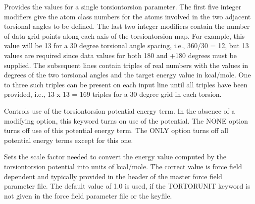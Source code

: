\documentclass[letterpaper,11pt,english]{sphinxmanual}
\begin{document}
\ignorespaces {}\label{\detokenize{text/keywords:key-tortors}}\begin{description}
\sphinxAtStartPar
Provides the values for a single torsion\sphinxhyphen{}torsion parameter. The first five integer modifiers give the atom class numbers for the atoms involved in the two adjacent torsional angles to be defined. The last two integer modifiers contain the number of data grid points along each axis of the torsion\sphinxhyphen{}torsion map. For example, this value will be 13 for a 30 degree torsional angle spacing, i.e., 360/30 = 12, but 13 values are required since data values for both \sphinxhyphen{}180 and +180 degrees must be supplied. The subsequent lines contain triples of real numbers with the values in degrees of the two torsional angles and the target energy value in kcal/mole. One to three such triples can be present on each input line until all triples have been provided, i.e., 13 x 13 = 169 triples for a 30 degree grid in each torsion.

\end{description}

\ignorespaces {}\label{\detokenize{text/keywords:key-tortorterm}}\begin{description}
\sphinxAtStartPar
Controls use of the torsion\sphinxhyphen{}torsion potential energy term. In the absence of a modifying option, this keyword turns on use of the potential. The NONE option turns off use of this potential energy term. The ONLY option turns off all potential energy terms except for this one.

\end{description}

\ignorespaces {}\label{\detokenize{text/keywords:key-tortorunit}}\begin{description}
\sphinxAtStartPar
Sets the scale factor needed to convert the energy value computed by the torsion\sphinxhyphen{}torsion potential into units of kcal/mole. The correct value is force field dependent and typically provided in the header of the master force field parameter file. The default value of 1.0 is used, if the TORTORUNIT keyword is not given in the force field parameter file or the keyfile.

\end{description}
\end{document}
